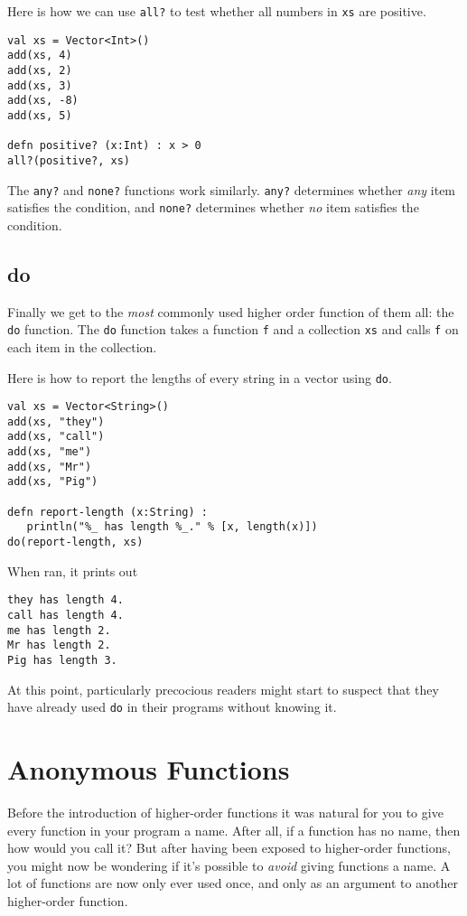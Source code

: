 \documentclass[10pt,oneside]{book}
\begin{document}
Here is how we can use \texttt{\frenchspacing all?} to test whether all numbers in \texttt{\frenchspacing xs} are positive.
\begin{lstlisting}
val xs = Vector<Int>()
add(xs, 4)
add(xs, 2)
add(xs, 3)
add(xs, -8)
add(xs, 5)

defn positive? (x:Int) : x > 0
all?(positive?, xs)
\end{lstlisting}

The \texttt{\frenchspacing any?} and \texttt{\frenchspacing none?} functions work similarly. \texttt{\frenchspacing any?} determines whether {\em any} item satisfies the condition, and \texttt{\frenchspacing none?} determines whether {\em no} item satisfies the condition.

\subsection*{do}
Finally we get to the {\em most} commonly used higher order function of them all: the \texttt{\frenchspacing do} function. The \texttt{\frenchspacing do} function takes a function \texttt{\frenchspacing f} and a collection \texttt{\frenchspacing xs} and calls \texttt{\frenchspacing f} on each item in the collection.

Here is how to report the lengths of every string in a vector using \texttt{\frenchspacing do}. 
\begin{lstlisting}
val xs = Vector<String>()
add(xs, "they")
add(xs, "call")
add(xs, "me")
add(xs, "Mr")
add(xs, "Pig")

defn report-length (x:String) :
   println("%_ has length %_." % [x, length(x)])
do(report-length, xs)
\end{lstlisting}
When ran, it prints out
\begin{lstlisting}
they has length 4.
call has length 4.
me has length 2.
Mr has length 2.
Pig has length 3.
\end{lstlisting}

At this point, particularly precocious readers might start to suspect that they have already used \texttt{\frenchspacing do} in their programs without knowing it.

\section{Anonymous Functions}
Before the introduction of higher-order functions it was natural for you to give every function in your program a name. After all, if a function has no name, then how would you call it? But after having been exposed to higher-order functions, you might now be wondering if it's possible to {\em avoid} giving functions a name. A lot of functions are now only ever used once, and only as an argument to another higher-order function. 
\end{document}
